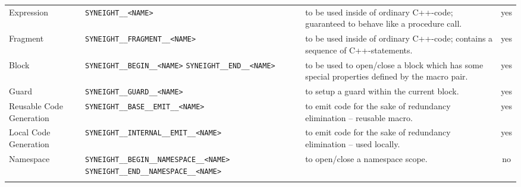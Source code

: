 \begin{center}
\begin{footnotesize}
\begin{tabular}{||l|p{5cm}|p{7cm}|c||}
Expression & 
{\tt SYNEIGHT\_\_<NAME>}
&    
to be used inside of ordinary C++-code; guaranteed to behave like a
procedure call.
& yes \\ \hhline{||----||}

Fragment & 
{\tt SYNEIGHT\_\_FRAGMENT\_\_<NAME>}
&    
to be used inside of ordinary C++-code; contains a sequence of C++-statements.
& yes \\ \hhline{||----||}

Block & 
{\tt SYNEIGHT\_\_BEGIN\_\_<NAME>}
{\tt SYNEIGHT\_\_END\_\_<NAME>}
&    
to be used to open/close a block which has some special properties
defined by the macro pair.
& yes \\ \hhline{||----||}

Guard & 
{\tt SYNEIGHT\_\_GUARD\_\_<NAME>}
&    
to setup a guard within the current block.
& yes \\ \hhline{||----||}

Reusable Code Generation & 
{\tt SYNEIGHT\_\_BASE\_\_EMIT\_\_<NAME>}
&    
to emit code for the sake of redundancy elimination -- reusable macro.
& yes \\ \hhline{||----||}

Local Code Generation & 
{\tt SYNEIGHT\_\_INTERNAL\_\_EMIT\_\_<NAME>}
&    
to emit code for the sake of redundancy elimination -- used locally.
& yes \\ \hhline{||----||}



Namespace  & 
{\tt SYNEIGHT\_\_BEGIN\_\_NAMESPACE\_\_<NAME>}
{\tt SYNEIGHT\_\_END\_\_NAMESPACE\_\_<NAME>}
&    
to open/close a namespace scope.
& no \\ 
\hhline{|b:====:b|}
\end{tabular}\end{footnotesize}\end{center}



